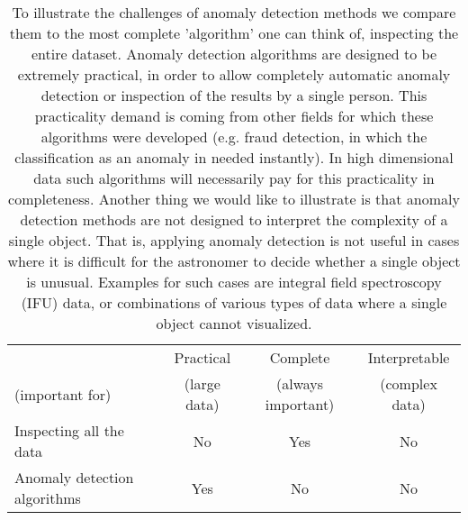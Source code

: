 \begin{table}
\begin{center}


\tiny
\begin{tabular}{l|c|c|c}

\toprule
 & Practical & Complete    & Interpretable \\
(important for) &   (large data) & (always important) &   (complex data)      \\
\midrule
 Inspecting all the data &  No &   Yes & No        \\
 Anomaly detection algorithms &  Yes &   No & No        \\

\bottomrule
\end{tabular}
\caption{To illustrate the challenges of anomaly detection methods we compare them to the most complete 'algorithm' one can think of, inspecting the entire dataset. Anomaly detection algorithms are designed to be extremely practical, in order to allow completely automatic anomaly detection or inspection of the results by a single person. This practicality demand is coming from other fields for which these algorithms were developed (e.g. fraud detection, in which the classification as an anomaly in needed instantly). In high dimensional data such algorithms will necessarily pay for this practicality in completeness.  Another thing we would like to illustrate is that anomaly detection methods are not designed to interpret the complexity of a single object. That is, applying anomaly detection is not useful in cases where it is difficult for the astronomer to decide whether a single object is unusual. Examples for such cases are integral field spectroscopy (IFU) data, or combinations of various types of data where a single object cannot visualized. }
\label{tab:adt}

\large
\end{center}
\end{table}
